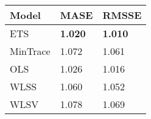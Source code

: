 
\begin{tabular}{lll}

Model & MASE & RMSSE\\
\midrule
ETS & \textbf{1.020} & \textbf{1.010}\\
MinTrace & 1.072 & 1.061\\
OLS & 1.026 & 1.016\\
WLSS & 1.060 & 1.052\\
WLSV & 1.078 & 1.069\\

\end{tabular}